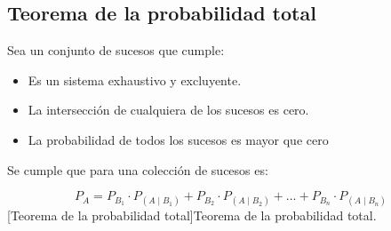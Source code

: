 \subsection{Teorema de la probabilidad total}
Sea un conjunto de sucesos que cumple:
\begin{itemize}[itemsep=0pt,parsep=0pt,topsep=0pt,partopsep=0pt]
    \item Es un sistema exhaustivo y excluyente.
    \item La intersección de cualquiera de los sucesos es cero.
    \item La probabilidad de todos los sucesos es mayor que cero
\end{itemize}
Se cumple que para una colección de sucesos es:
\begin{center}
    \begin{equation}
        P_A = P_{B_1} \cdot P_{\left( A\mid B_1\right) } + P_{B_2} \cdot P_{\left( A\mid B_2\right) } + \dots +P_{B_n} \cdot P_{\left( A\mid B_n\right) }
    \end{equation}
    [Teorema de la probabilidad total]{Teorema de la probabilidad total.}
\end{center}
